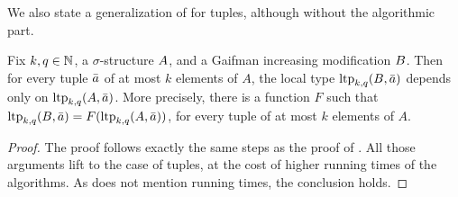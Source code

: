 We also state a generalization of  for tuples, although without the algorithmic part. 
\begin{lemma}
    \label{lem:modification-tuples}
    Fix $k,q\in\mathbb N$, a $\sigma$-structure \({{A}}\), and a Gaifman increasing modification \({{B}}\).
    Then for every tuple $\bar a$ of at most $k$ elements of $A$, the local type $\textnormal{ltp}_{k,q}({{B}},\bar a)$ depends only on $\textnormal{ltp}_{k,q}({{A}},\bar a)$.
    More precisely, there is a function $F$ such that $\textnormal{ltp}_{k,q}({{B}},\bar a)=F(\textnormal{ltp}_{k,q}({{A}},\bar a))$, for every tuple of at most $k$ elements of $A$.
\end{lemma}
\begin{proof}
    The proof follows exactly the same steps as the proof of . All those arguments lift to the case of tuples, at the cost of higher running times of the algorithms. As  does not mention running times, the conclusion holds.
\end{proof}



